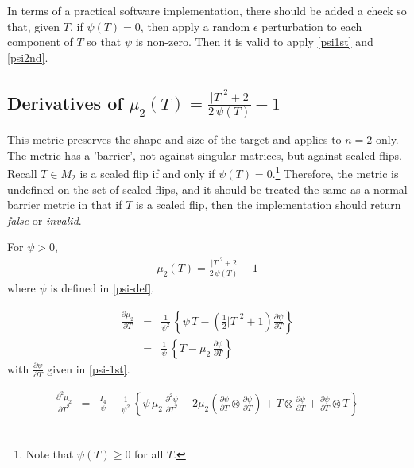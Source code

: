 \documentclass{report}
\begin{document}
\noindent In terms of a practical software implementation, there should be 
added a check so that, given $T$, if $\psi(T) = 0$, then apply
a random $\epsilon$ perturbation to each component of $T$ so that $\psi$ 
is non-zero.  Then it is valid to apply \ref{psi1st} and \ref{psi2nd}. \newline

\subsection{Derivatives of $\mu_2(T)=\frac{|T|^2 + 2}{2 \, \psi(T)}-1$ \label{magic2}}

\noindent This metric preserves the shape and size of the target and applies
to $n=2$ only. The metric has a 'barrier', not against singular matrices,
but against scaled flips. Recall $T \in M_2$ is a scaled flip if and only if 
$\psi(T)=0$.\footnote{Note that $\psi(T) \geq 0$ for all $T$.} Therefore, the metric is undefined on the set of 
scaled flips, and it should be treated the same as a normal barrier metric 
in that if $T$ is a scaled flip, then the implementation should return 
{\it false} or {\it invalid}. \newline

\noindent For $\psi> 0$,
\begin{eqnarray}
\mu_2(T)=\frac{|T|^2 + 2}{2 \, \psi(T)} - 1
\end{eqnarray}
where $\psi$ is defined in \ref{psi-def}. \newline

\begin{eqnarray}
\frac{\partial \mu_2}{\partial T} & = & \frac{1}{\psi^2} \, \left\{ \psi \, T - \left( \frac{1}{2} |T|^2 + 1 \right) \frac{\partial \psi}{\partial T} \right\} \\
& = & \frac{1}{\psi} \, \left\{ T - \mu_2 \,  \frac{\partial \psi}{\partial T} \right\} 
\end{eqnarray}
with $\frac{\partial \psi}{\partial T}$ given in \ref{psi-1st}. \newline

\begin{eqnarray}
\frac{\partial^2 \mu_2}{\partial T^2} & = & \frac{I_4}{\psi} - \frac{1}{\psi^2} \, \left\{ \psi \, \mu_2 \, \frac{\partial^2 \psi}{\partial T^2} - 2 \mu_2 \left( \frac{\partial \psi}{\partial T} \otimes \frac{\partial \psi}{\partial T} \right) + T \otimes \frac{\partial \psi}{\partial T} + \frac{\partial \psi}{\partial T} \otimes T \right\} \nonumber \\
\end{eqnarray}
\end{document}
